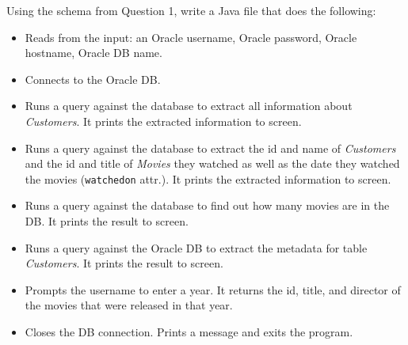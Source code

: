 \documentclass[letterpaper, 11pt]{article}
\begin{document}
Using the schema from Question 1, write a Java file that does the following:
\begin{itemize}[label=-,leftmargin=*]
    \item Reads from the input: an Oracle username, Oracle password, Oracle hostname, Oracle DB name.
    \item Connects to the Oracle DB.
    \item Runs a query against the database to extract all information about \textit{Customers}. It prints the extracted information to screen.
    \item Runs a query against the database to extract the id and name of \textit{Customers} and the id and title of \textit{Movies} they watched as well as the date they watched the movies (\texttt{watchedon} attr.). It prints the extracted information to screen.
    \item Runs a query against the database to find out how many movies are in the DB. It prints the result to screen.
    \item Runs a query against the Oracle DB to extract the metadata for table \textit{Customers}. It prints the result to screen.
    \item Prompts the username to enter a year. It returns the id, title, and director of the movies that were released in that year.
    \item Closes the DB connection. Prints a message and exits the program.
\end{itemize}
\end{document}
